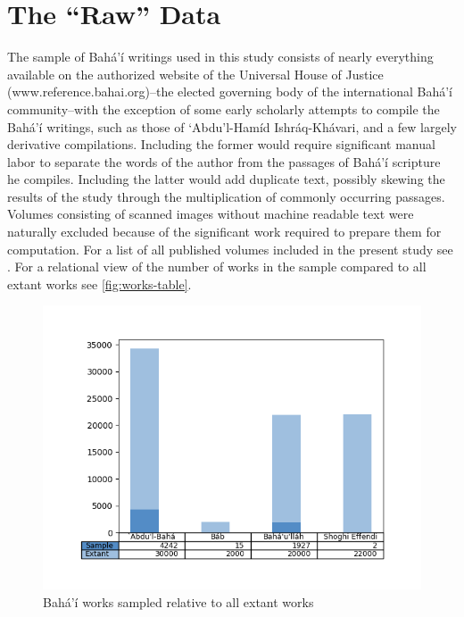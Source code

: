 \documentclass[12pt, oneside]{report}
\begin{document}
\section{The ``Raw'' Data}
\par
The sample of Bah\'{a}'\'{i}  writings used in this study consists of nearly everything available on the authorized website of the Universal House of Justice (www.reference.bahai.org)–the elected governing body of the international  Bah\'{a}'\'{i} community–with the exception of some early scholarly attempts to compile the Bah\'{a}'\'{i} writings, such as those of `Abdu'l-Ham\'{i}d Ishr\'{a}q-Kh\'{a}vari, and a few largely derivative compilations. Including the former would require significant manual labor to separate the words of the author from the passages of Bah\'{a}'\'{i} scripture he compiles. Including the latter would add duplicate text, possibly skewing the results of the study through the multiplication of commonly occurring passages. Volumes consisting of scanned images without machine readable text were naturally excluded because of the significant work required to prepare them for computation. For a list of all published volumes included in the present study see . For a relational view of the number of works in the sample compared to all extant works see \autoref{fig:works-table}.
\begin{figure}[htb]
\centering
\includegraphics[width=15cm]{figures/works-table.png}
\caption[Bah\'{a}'\'{i} works sampled relative to all extant works]{Bah\'{a}'\'{i} works sampled relative to all extant works}
\label{fig:works-table}
\end{figure} 
\end{document}
